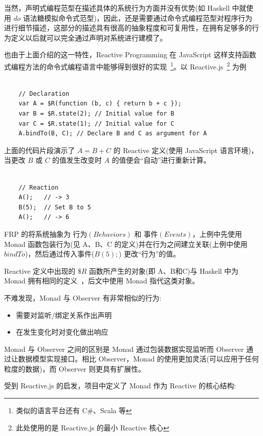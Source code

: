 当然，声明式编程范型在描述具体的系统行为方面并没有优势(如 Haskell 中就使用 $do$ 语法糖模拟命令式范型)，因此，还是需要通过命令式编程范型对程序行为进行细节描述，这部分的描述具有很高的抽象程度和可复用性，在拥有足够多的行为定义以后就可以完全通过声明对系统进行建模了。

也由于上面介绍的这一特性，Reactive Programming 在 JavaScript 这样支持函数式编程方法的命令式编程语言中能够得到很好的实现~\footnote{类似的语言平台还有 C\#、Scala 等}。以 Reactive.js~\footnote{此处使用的是 Reactive.js 的最小 Reactive 核心} 为例~\cite{Carkci2013}

\begin{verbatim}

    // Declaration
    var A = $R(function (b, c) { return b + c });
    var B = $R.state(2); // Initial value for B
    var C = $R.state(1); // Initial value for C
    A.bindTo(B, C); // Declare B and C as argument for A

\end{verbatim}

上面的代码片段演示了 $A = B + C$ 的 Reactive 定义(使用 JavaScript 语言环境)，当更改 $B$ 或 $C$ 的值发生改变时 $A$ 的值便会“自动”进行重新计算。

\begin{verbatim}

    // Reaction
    A();   // -> 3
    B(5);  // Set B to 5
    A();   // -> 6

\end{verbatim}

FRP 的将系统抽象为 $行为(Behaviors)$ 和 $事件(Events)$，上例中先使用 Monad 函数包装行为(见 A、B、C 的定义)并在行为之间建立关联(上例中使用 $bindTo$)，然后通过传入事件($B(5);$) 更改“行为”的值。

Reactive 定义中出现的 $\$R$ 函数所产生的对象(即 A、B和C)与 Haskell 中为 Monad 拥有相同的定义~\cite{raey}，后文中使用 Monad 指代这类对象。

不难发现，Monad 与 Observer 有非常相似的行为:

\begin{itemize}
  \item 需要对监听/绑定关系作出声明
  \item 在发生变化时对变化做出响应
\end{itemize}

Monad 与 Observer 之间的区别是 Monad 通过包装数据实现监听而 Observer 通过让数据模型实现接口。相比 Observer，Monad 的使用更加灵活(可以应用于任何粒度的数据)，而 Observer 则更具有扩展性。

受到 Reactive.js 的启发，项目中定义了 Monad 作为 Reactive 的核心结构:

